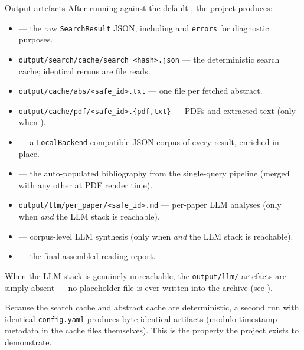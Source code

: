 \documentclass[
  ignorenonframetext,
]{beamer}
\providecommand{\tightlist}{%
  \setlength{\itemsep}{0pt}\setlength{\parskip}{0pt}}
\begin{document}
\begin{frame}{Output artefacts}
\protect{}\label{output-artefacts}
After running  against the
default , the project produces:

\begin{itemize}
\tightlist
\item
   --- the raw \texttt{SearchResult}
  JSON, including  and \texttt{errors} for
  diagnostic purposes.
\item
  \texttt{output/search/cache/search\_\textless{}hash\textgreater{}.json}
  --- the deterministic search cache; identical reruns are file reads.
\item
  \texttt{output/cache/abs/\textless{}safe\_id\textgreater{}.txt} ---
  one file per fetched abstract.
\item
  \texttt{output/cache/pdf/\textless{}safe\_id\textgreater{}.\{pdf,txt\}}
  --- PDFs and extracted text (only when
  ).
\item
   --- a \texttt{LocalBackend}-compatible
  JSON corpus of every result, enriched in place.
\item
   --- the auto-populated bibliography
  from the single-query pipeline (merged with any other
   at PDF render time).
\item
  \texttt{output/llm/per\_paper/\textless{}safe\_id\textgreater{}.md}
  --- per-paper LLM analyses (only when 
  \emph{and} the LLM stack is reachable).
\item
   --- corpus-level LLM synthesis (only
  when  \emph{and} the LLM stack is
  reachable).
\item
   --- the final assembled reading
  report.
\end{itemize}

When the LLM stack is genuinely unreachable, the \texttt{output/llm/}
artefacts are simply absent --- no placeholder file is ever written into
the archive (see ).

Because the search cache and abstract cache are deterministic, a second
run with identical \texttt{config.yaml} produces byte-identical
artifacts (modulo timestamp metadata in the cache files themselves).
This is the property the project exists to demonstrate.


\end{frame}
\end{document}
